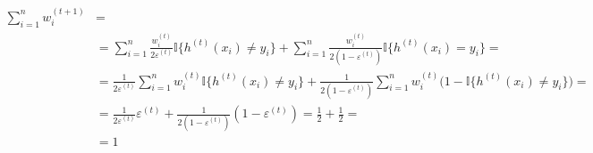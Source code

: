 \begin{equation*}
\begin{split}
	\sum_{i=1}^{n}w_{i}^{(t+1)} & = \\
	& = \sum_{i=1}^{n}\frac{w_{i}^{(t)}}{2\varepsilon^{(t)}}\mathbb{I}
		\lbrace 
			h^{(t)}(x_{i}) \neq y_{i}
		\rbrace 
	+
	\sum_{i=1}^{n}\frac{w_{i}^{(t)}}{2(1-\varepsilon^{(t)})}\mathbb{I}
	\lbrace
		h^{(t)}(x_{i}) = y_{i}
	\rbrace = \\ 
	& = \frac{1}{2\varepsilon^{(t)}}\sum_{i=1}^{n}w_{i}^{(t)}\mathbb{I}
	\lbrace 
		h^{(t)}(x_{i}) \neq y_{i} 
	\rbrace 
	+ 
	\frac{1}{2(1-\varepsilon^{(t)})}\sum_{i=1}^{n}w_{i}^{(t)}
	\big(
		1-\mathbb{I} \lbrace
			{h^{(t)}}(x_{i}) \neq y_{i}
		\rbrace
	\big) = \\ 
	& = \frac{1}{2\varepsilon^{(t)}}\varepsilon^{(t)}+\frac{1}{2(1-\varepsilon^{(t)})}
	(
		1-\varepsilon^{(t)}
	) =
	\frac{1}{2} + \frac{1}{2} = \\
	& = 1
\end{split}
\end{equation*}






